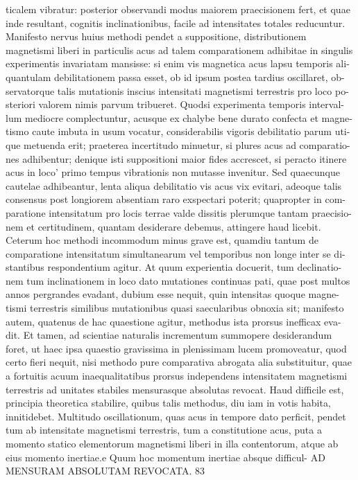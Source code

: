 \documentclass[12pt,a4paper]{article}
\begin{document}
ticalem vibratur: posterior observandi modus maiorem praecisionem fert, et quae
inde resultant, cognitis inclinationibus, facile ad intensitates totales reducuntur.
Manifesto nervus huius methodi pendet a suppositione, distributionem
magnetismi liberi in particulis acus ad talem comparationem adhibitae in singulis
experimentis invariatam mansisse: si enim vis magnetica acus lapsu temporis ali-
quantulam debilitationem passa esset, ob id ipsum postea tardius oscillaret, ob-
servatorque talis mutationis inscius intensitati magnetismi terrestris pro loco po-
steriori valorem nimis parvum tribueret.    Quodsi experimenta temporis interval-
lum mediocre complectuntur, acusque ex chalybe bene durato confecta et magne-
tismo caute imbuta in usum vocatur, considerabilis vigoris debilitatio parum uti-
que metuenda erit; praeterea incertitudo minuetur, si plures acus ad comparatio-
nes adhibentur; denique isti suppositioni maior fides accrescet, si peracto itinere
acus in loco' primo tempus vibrationis non mutasse invenitur.      Sed quaecunque
cautelae adhibeantur, lenta aliqua debilitatio vis acus vix evitari, adeoque talis
consensus post longiorem absentiam raro exspectari poterit; quapropter in com-
paratione intensitatum pro locis terrae valde dissitis plerumque tantam praecisio-
nem et certitudinem,   quantam desiderare debemus,         attingere haud licebit.
Ceterum hoc methodi incommodum minus grave est, quamdiu tantum de
comparatione intensitatum simultanearum vel temporibus non longe inter se di-
stantibus respondentium agitur. At quum experientia docuerit, tum declinatio-
nem   tum inclinationem in loco dato mutationes continuas pati, quae post multos
annos pergrandes evadant, dubium esse nequit, quin intensitas quoque magne-
tismi terrestris similibus mutationibus quasi saecularibus obnoxia sit; manifesto
autem, quatenus de hac quaestione agitur, methodus ista prorsus inefficax eva-
dit.    Et tamen, ad scientiae naturalis incrementum summopere desiderandum
foret, ut haec ipsa quaestio gravissima in plenissimam lucem promoveatur, quod
certo fieri nequit, nisi methodo pure comparativa abrogata alia substituitur, quae
a fortuitis acuum inaequalitatibus prorsus independens intensitatem magnetismi
terrestris ad unitates stabiles mensurasque absolutas revocat.
Haud difficile est, principia theoretica stabilire, quibus talis methodus, diu
iam in votis habita, innitidebet.     Multitudo oscillationum,
quas acus in tempore
dato perficit, pendet tum ab intensitate magnetismi terrestris, tum a constitutione
acus, puta a momento statico elementorum magnetismi liberi in illa contentorum,
atque ab eius momento inertiae.e    Quum hoc momentum inertiae absque difficul-
AD   MENSURAM   ABSOLUTAM   REVOCATA.                   83
\end{document}
